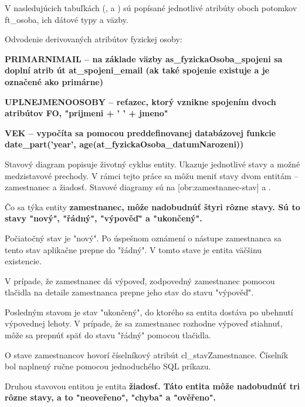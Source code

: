 V nasledujúcich tabuľkách (\in[tab:FO1], \in[tab:PO1] a ) sú popísané jednotlivé atribúty oboch potomkov ft_osoba, ich dátové typy a väzby.

Odvodenie derivovaných atribútov fyzickej osoby: %



\startitemize
\item {\start\bf PRIMARNIMAIL \stop -- na základe väzby as_fyzickaOsoba_spojeni sa doplní atrib	út at_spojeni_email (ak také spojenie existuje a je označené ako primárne)}
\item {\start\bf UPLNEJMENOOSOBY \stop -- reťazec, ktorý vznikne spojením dvoch atribútov FO, "prijmeni + ' ' + jmeno"}
\item {\start\bf VEK \stop -- vypočíta sa pomocou preddefinovanej databázovej funkcie \zlom date_part('year', age(at_fyzickaOsoba_datumNarozeni)) }
\stopitemize


Stavový diagram popisuje životný cyklus entity. Ukazuje jednotlivé stavy a možné medzistavové prechody. V rámci tejto práce sa môžu meniť stavy dvom entitám -- zamestnanec a žiadosť. Stavové diagramy sú na [obr:zamestnanec-stav] a .

\blank
Čo sa týka entity \start\bf zamestnanec\stop, môže nadobudnúť štyri rôzne stavy. Sú to stavy "nový", "řádný", "výpověď" a "ukončený".

Počiatočný stav je "nový". Po úspešnom oznámení o nástupe zamestnanca sa tento stav aplikačne prepne do "řádný". V tomto stave je entita väčšinu existencie. 

V prípade, že zamestnanec dá výpoveď, zodpovedný zamestnanec pomocou tlačidla na detaile zamestnanca prepne jeho stav do stavu "výpověď". 

Posledným stavom je stav "ukončený", do ktorého sa entita dostáva po ubehnutí výpovednej lehoty. V prípade, že sa zamestnanec rozhodne výpoveď stiahnuť, môže sa prepnúť späť do stavu "řádný" pomocou tlačidla. 

O stave zamestnancov hovorí číselníkový atribút cl_stavZamestnance. Číselník bol naplnený ručne pomocou jednoduchého SQL príkazu.

\blank
Druhou stavovou entitou je entita  \start\bf žiadosť\stop. Táto entita môže nadobudnúť tri rôzne stavy, a to "neoveřeno", "chyba" a "ověřeno". 

